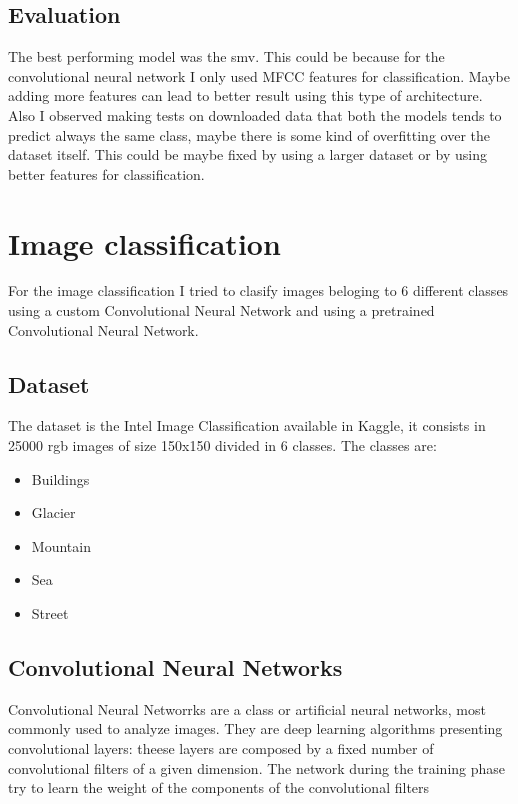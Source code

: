 \documentclass[12pt,journal,compsoc]{IEEEtran}
\begin{document}
\subsection{Evaluation}
The best performing model was the smv. This could be because for the convolutional neural network I only used MFCC features for classification. Maybe adding more features can lead to better result using this type of architecture. Also I observed making tests on downloaded data that both the models tends to predict always the same class, maybe there is some kind of overfitting over the dataset itself. This could be maybe fixed by using a larger dataset or by using better features for classification.
\section{Image classification}
For the image classification I tried to clasify images beloging to 6 different classes using a custom Convolutional Neural Network and using a pretrained Convolutional Neural Network.
\subsection{Dataset}
The dataset is the Intel Image Classification\cite{dataset2} available in Kaggle, it consists in 25000 rgb images of size 150x150 divided in 6 classes.
The classes are:
\begin{itemize}
	\item Buildings
	\item Glacier
	\item Mountain
	\item Sea 
	\item Street
\end{itemize}
\subsection{Convolutional Neural Networks}
Convolutional Neural Networrks are a class or artificial neural networks, most commonly used to analyze images\cite{CNNs}.
They are deep learning algorithms presenting convolutional layers: theese layers are composed by a fixed number of convolutional filters of a given dimension. The network during the training phase try to learn the weight of the components of the convolutional filters
\end{document}
